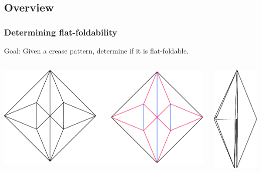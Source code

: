 \documentclass{beamer}
\begin{document}
\def\O{\mathcal{L}}

\subsection{Overview}
\begin{frame} 
\frametitle{Determining flat-foldability}

\begin{block}{Goal:}
Given a crease pattern, determine if it is flat-foldable.
\end{block}

\bigskip

\begin{columns}[c]
\includegraphics[width=\textwidth]{sam_images/bird-base-unfolded.pdf}

\pause

\includegraphics[height=.5\textheight]{sam_images/bird-base-folded.pdf}

\end{columns}

\end{frame}
\end{document}
